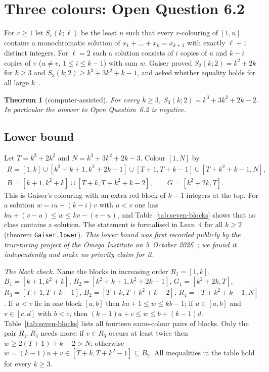 \documentclass[11pt]{amsart}
\newtheorem{theorem}{Theorem}
\theoremstyle{definition}
\begin{document}
\section{Three colours: Open Question 6.2}\label{sec:oq62}

For $r\ge1$ let $S_r(k;\ell)$ be the least $n$ such that every $r$-colouring of $[1,n]$ contains a monochromatic solution of $x_1+\dots+x_k=x_{k+1}$ with exactly $\ell+1$ distinct integers. For $\ell=2$ such a solution consists of $i$ copies of $u$ and $k-i$ copies of $v$ ($u\ne v$, $1\le i\le k-1$) with sum $w$. Gaiser proved $S_2(k;2)=k^2+2k$ for $k\ge3$ and $S_3(k;2)\ge k^3+3k^2+k-1$, and asked whether equality holds for all large $k$~\cite[Open Question~6.2]{Gaiser}.

\begin{theorem}[computer-assisted]\label{thm:oq62}
For every $k\ge3$, $S_3(k;2)=k^3+3k^2+2k-2$. In particular the answer to Open Question~6.2 is negative.
\end{theorem}

\subsection*{Lower bound} Let $T=k^3+2k^2$ and $N=k^3+3k^2+2k-3$. Colour $[1,N]$ by
\begin{gather*}
R=[1,k]\cup[k^2+k+1,k^2+2k-1]\cup[T+1,T+k-1]\cup[T+k^2+k-1,N],\\
B=[k+1,k^2+k]\cup[T+k,T+k^2+k-2],\qquad G=[k^2+2k,T].
\end{gather*}
This is Gaiser's colouring with an extra red block of $k-1$ integers at the top. For a solution $w=iu+(k-i)v$ with $u<v$ one has $ku+(v-u)\le w\le kv-(v-u)$, and Table~\ref{tab:seven-blocks} shows that no class contains a solution. The statement is formalised in Lean~4 for all $k\ge2$ (theorem \texttt{Gaiser.lower}). \emph{This lower bound was first recorded publicly by the trureturing project of the Omega Institute on 5~October 2026~\cite{omega}; we found it independently and make no priority claim for it.}

\smallskip\noindent\emph{The block check.} Name the blocks in increasing order $R_1=[1,k]$, $B_1=[k+1,k^2+k]$, $R_2=[k^2+k+1,k^2+2k-1]$, $G_1=[k^2+2k,T]$, $R_3=[T+1,T+k-1]$, $B_2=[T+k,T+k^2+k-2]$, $R_4=[T+k^2+k-1,N]$. If $u<v$ lie in one block $[a,b]$ then $ka+1\le w\le kb-1$; if $u\in[a,b]$ and $v\in[c,d]$ with $b<c$, then $(k-1)a+c\le w\le b+(k-1)d$. Table~\ref{tab:seven-blocks} lists all fourteen same-colour pairs of blocks. Only the pair $R_1,R_3$ needs more: if $v\in R_3$ occurs at least twice then $w\ge2(T+1)+k-2>N$; otherwise $w=(k-1)u+v\in[T+k,T+k^2-1]\subseteq B_2$. All inequalities in the table hold for every $k\ge3$.
\end{document}
